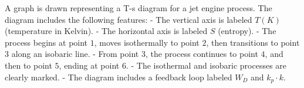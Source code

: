 A graph is drawn representing a T-s diagram for a jet engine process. The diagram includes the following features:  
- The vertical axis is labeled \( T(K) \) (temperature in Kelvin).  
- The horizontal axis is labeled \( S \) (entropy).  
- The process begins at point \( 1 \), moves isothermally to point \( 2 \), then transitions to point \( 3 \) along an isobaric line.  
- From point \( 3 \), the process continues to point \( 4 \), and then to point \( 5 \), ending at point \( 6 \).  
- The isothermal and isobaric processes are clearly marked.  
- The diagram includes a feedback loop labeled \( W_D \) and \( k_{p} \cdot k \).